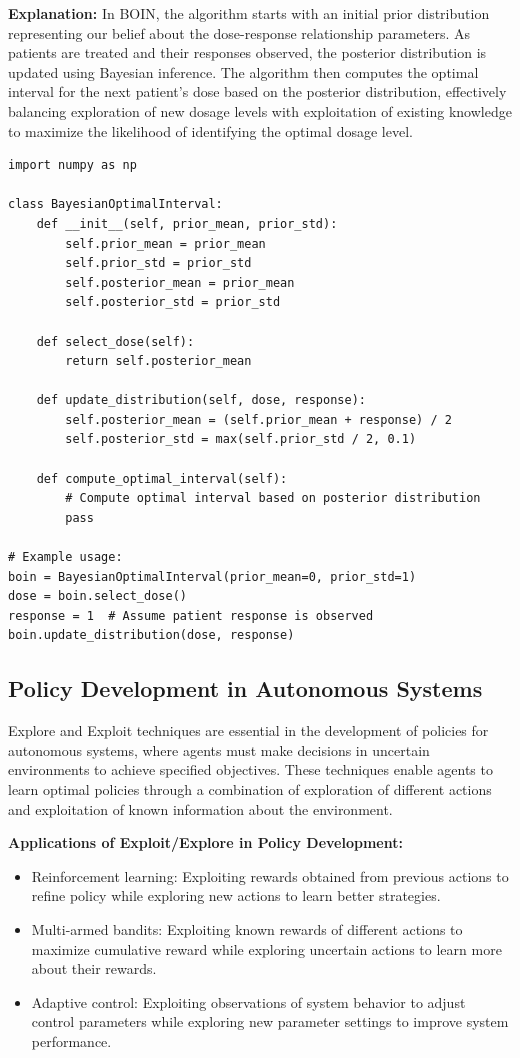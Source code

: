 \documentclass[12pt]{book} %
\begin{document}
\textbf{Explanation:}
In BOIN, the algorithm starts with an initial prior distribution representing our belief about the dose-response relationship parameters. As patients are treated and their responses observed, the posterior distribution is updated using Bayesian inference. The algorithm then computes the optimal interval for the next patient's dose based on the posterior distribution, effectively balancing exploration of new dosage levels with exploitation of existing knowledge to maximize the likelihood of identifying the optimal dosage level.

\FloatBarrier
\begin{lstlisting}
import numpy as np

class BayesianOptimalInterval:
    def __init__(self, prior_mean, prior_std):
        self.prior_mean = prior_mean
        self.prior_std = prior_std
        self.posterior_mean = prior_mean
        self.posterior_std = prior_std
    
    def select_dose(self):
        return self.posterior_mean
    
    def update_distribution(self, dose, response):
        self.posterior_mean = (self.prior_mean + response) / 2
        self.posterior_std = max(self.prior_std / 2, 0.1)
    
    def compute_optimal_interval(self):
        # Compute optimal interval based on posterior distribution
        pass

# Example usage:
boin = BayesianOptimalInterval(prior_mean=0, prior_std=1)
dose = boin.select_dose()
response = 1  # Assume patient response is observed
boin.update_distribution(dose, response)
\end{lstlisting}

\subsection{Policy Development in Autonomous Systems}
Explore and Exploit techniques are essential in the development of policies for autonomous systems, where agents must make decisions in uncertain environments to achieve specified objectives. These techniques enable agents to learn optimal policies through a combination of exploration of different actions and exploitation of known information about the environment.

\textbf{Applications of Exploit/Explore in Policy Development:}
\begin{itemize}
    \item Reinforcement learning: Exploiting rewards obtained from previous actions to refine policy while exploring new actions to learn better strategies.
    \item Multi-armed bandits: Exploiting known rewards of different actions to maximize cumulative reward while exploring uncertain actions to learn more about their rewards.
    \item Adaptive control: Exploiting observations of system behavior to adjust control parameters while exploring new parameter settings to improve system performance.
\end{itemize}
\end{document}
